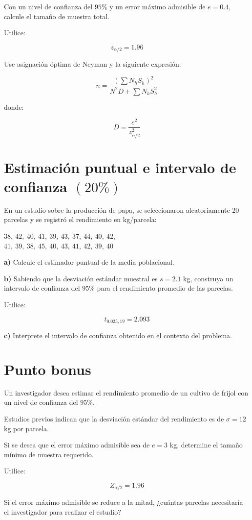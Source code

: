 \documentclass[12pt]{article}
\begin{document}
Con un nivel de confianza del $95\%$ y un error máximo admisible de $e=0.4$, calcule el tamaño de muestra total.

Utilice:

\[
z_{\alpha/2}=1.96
\]

Use asignación óptima de Neyman y la siguiente expresión:

\[
n=\frac{\left(\sum N_hS_h\right)^2}
{N^2D+\sum N_hS_h^2}
\]

donde:

\[
D=\frac{e^2}{z_{\alpha/2}^2}
\]


\section{Estimación puntual e intervalo de confianza $(20\%)$}

En un estudio sobre la producción de papa, se seleccionaron aleatoriamente $20$ parcelas y se registró el rendimiento en kg/parcela:

\begin{center}
$38,\ 42,\ 40,\ 41,\ 39,\ 43,\ 37,\ 44,\ 40,\ 42,$\\
$41,\ 39,\ 38,\ 45,\ 40,\ 43,\ 41,\ 42,\ 39,\ 40$
\end{center}

\textbf{a)} Calcule el estimador puntual de la media poblacional.

\textbf{b)} Sabiendo que la desviación estándar muestral es $s=2.1$ kg, construya un intervalo de confianza del $95\%$ para el rendimiento promedio de las parcelas.

Utilice:

\[
t_{0.025,19}=2.093
\]

\textbf{c)} Interprete el intervalo de confianza obtenido en el contexto del problema.


\section{Punto bonus}

Un investigador desea estimar el rendimiento promedio de un cultivo de fríjol con un nivel de confianza del $95\%$.

Estudios previos indican que la desviación estándar del rendimiento es de $\sigma=12$ kg por parcela.

Si se desea que el error máximo admisible sea de $e=3$ kg, determine el tamaño mínimo de muestra requerido.

Utilice:

\[
Z_{\alpha/2}=1.96
\]

Si el error máximo admisible se reduce a la mitad, ¿cuántas parcelas necesitaría el investigador para realizar el estudio?
\end{document}
